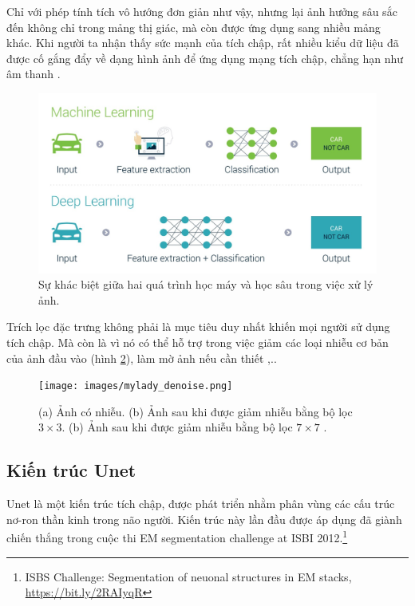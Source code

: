 \documentclass[a4paper, 12pt]{report}
\begin{document}
Chỉ với phép tính tích vô hướng đơn giản như vậy, nhưng lại ảnh hưởng sâu sắc đến không chỉ trong mảng thị giác, mà còn được ứng dụng sang nhiều mảng khác.
Khi người ta nhận thấy sức mạnh của tích chập, rất nhiều kiểu dữ liệu đã được cố gắng đẩy về dạng hình ảnh để ứng dụng mạng tích chập, chẳng hạn như âm thanh \cite{soundusingcnnieee, papiasoundcnn2021}.

\begin{figure}[!h]
\captionsetup{width=0.8\textwidth}
\centering
\includegraphics[width=15cm]{images/mlvsdlindip.jpg}
\caption{Sự khác biệt giữa hai quá trình học máy và học sâu trong việc xử lý ảnh.}
\label{fig:mlvsdlindip}
\end{figure}

Trích lọc đặc trưng không phải là mục tiêu duy nhất khiến mọi người sử dụng tích chập.
Mà còn là vì nó có thể hỗ trợ trong việc giảm các loại nhiễu cơ bản của ảnh đầu vào \cite{fu2018convolutional} (hình \ref{fig:mylady_denoise}), làm mờ ảnh nếu cần thiết \cite{szandala2020convolutional},..

\begin{figure}[!h]
\captionsetup{width=0.8\textwidth}
\centering
\texttt{[image: images/mylady\_denoise.png]}
\caption{(a) Ảnh có nhiễu. (b) Ảnh sau khi được giảm nhiễu bằng bộ lọc $3 \times 3$. (b) Ảnh sau khi được giảm nhiễu bằng bộ lọc $7 \times 7$ \cite{mlcobancnn2018}.}
\label{fig:mylady_denoise}
\end{figure}

\subsection{Kiến trúc Unet}

Unet là một kiến trúc tích chập, được phát triển nhằm phân vùng các cấu trúc nơ-ron thần kinh trong não người.
Kiến trúc này lần đầu được áp dụng đã giành chiến thắng trong cuộc thi EM segmentation challenge at ISBI 2012.\footnote{ISBS Challenge: Segmentation of neuonal structures in EM stacks, \href{https://bit.ly/2RAIyqR}{https://bit.ly/2RAIyqR}}\vspace{5pt}
\end{document}
